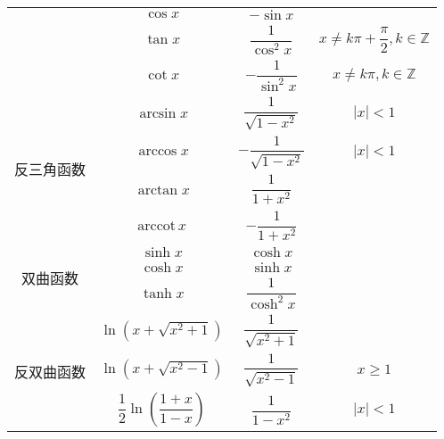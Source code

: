 \begin{table}
\begin{tabular}{|c|c|c|c|}
                                    & $\cos x$                                            & $-\sin x$                    &                                                \\
                                    & $\tan x$                                            & $\dfrac{1}{\cos^{2}x}$       & $x \ne k\pi + \dfrac{\pi}{2}, k\in \mathbb{Z}$ \\
                                    & $\cot x$                                            & $-\dfrac{1}{\sin^{2}x}$      & $x \ne k\pi, k\in \mathbb{Z}$                  \\[5pt]
        \hline
        \multirow{4}{*}{反三角函数} & $\arcsin x$                                         & $\dfrac{1}{\sqrt{1 - x^2}}$  & $|x| < 1$                                      \\
                                    & $\arccos x$                                         & $-\dfrac{1}{\sqrt{1 - x^2}}$ & $|x| < 1$                                      \\
                                    & $\arctan x$                                         & $\dfrac{1}{1 + x^2}$         &                                                \\
                                    & $\mathrm{arccot}\, x$                               & $-\dfrac{1}{1 + x^2}$        &                                                \\[5pt]
        \hline
        \multirow{3}{*}{双曲函数}   & $\sinh x$                                           & $\cosh x$                    &                                                \\
                                    & $\cosh x$                                           & $\sinh x$                    &                                                \\
                                    & $\tanh x$                                           & $\dfrac{1}{\cosh^{2}x}$      &                                                \\[5pt]
        \hline
        \multirow{3}{*}{反双曲函数} & $\ln (x + \sqrt{x^2 + 1})$                          & $\dfrac{1}{\sqrt{x^2 + 1}}$  &                                                \\
                                    & $\ln (x + \sqrt{x^2 - 1})$                          & $\dfrac{1}{\sqrt{x^2 - 1}}$  & $x \geqslant 1$                                \\
                                    & $\dfrac{1}{2}\ln \left(\dfrac{1 + x}{1 - x}\right)$ & $\dfrac{1}{1 - x^2}$         & $|x| < 1$                                      \\[5pt]
        \hline
    \end{tabular}
\end{table}


